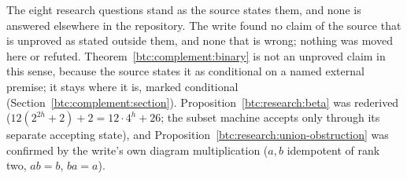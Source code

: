 \begin{writenote}
The eight research questions stand as the source states them, and none is
answered elsewhere in the repository. The write found no claim of the source
that is unproved as stated outside them, and none that is wrong; nothing was
moved here or refuted. Theorem~\ref{btc:complement:binary} is not an
unproved claim in this sense, because the source states it as conditional on
a named external premise; it stays where it is, marked conditional
(Section~\ref{btc:complement:section}). Proposition~\ref{btc:research:beta}
was rederived ($12(2^{2h}+2)+2=12\cdot4^h+26$; the subset machine accepts
only through its separate accepting state), and
Proposition~\ref{btc:research:union-obstruction} was confirmed by the write's
own diagram multiplication ($a,b$ idempotent of rank two, $ab=b$, $ba=a$).
\end{writenote}
